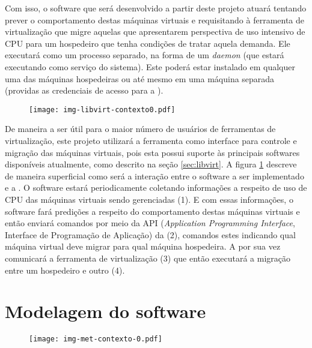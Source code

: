 Com isso, o software que será desenvolvido a partir deste projeto atuará
tentando prever o comportamento destas máquinas virtuais e requisitando à
ferramenta de virtualização que migre aquelas que apresentarem perspectiva
de uso intensivo de CPU para um hospedeiro que tenha condições de tratar
aquela demanda. Ele executará como um processo separado, na forma de um
\emph{daemon} (que estará executando como serviço do sistema). Este poderá
estar instalado em qualquer uma das máquinas hospedeiras ou até mesmo em
uma máquina separada (providas as credenciais de acesso para a \libvirt{}).

\begin{figure}[htp]
\centering
\texttt{[image: img-libvirt-contexto0.pdf]}
\label{fig:libvirtcontexto0}
\end{figure}

De maneira a ser útil para o maior número de usuários de ferramentas de
virtualização, este projeto utilizará a ferramenta \libvirt{} como
interface para controle e migração das máquinas virtuais, pois esta possui
suporte às principais softwares disponíveis atualmente, como descrito na
seção \ref{sec:libvirt}. A figura \ref{fig:libvirtcontexto0} descreve de
maneira superficial como será a interação entre o software a ser
implementado e a \libvirt{}. O software estará periodicamente coletando
informações a respeito de uso de CPU das máquinas virtuais sendo
gerenciadas (1). E com essas informações, o software fará predições a
respeito do comportamento destas máquinas virtuais e então enviará comandos
por meio da API (\emph{Application Programming Interface}, Interface de
Programação de Aplicação) da \libvirt{} (2), comandos estes indicando qual
máquina virtual deve migrar para qual máquina hospedeira. A \libvirt{} por
sua vez comunicará a ferramenta de virtualização (3) que então executará a
migração entre um hospedeiro e outro (4).


\section{Modelagem do software}\label{sec:modelagem}

\begin{figure}[htp]
\centering
\texttt{[image: img-met-contexto-0.pdf]}
\label{fig:contexto0}
\end{figure}

